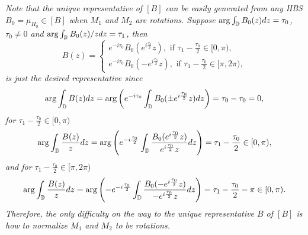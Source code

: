 \documentclass[review,onefignum,onetabnum]{siamonline190516}
\begin{document}
    {\it Note that the unique representative of $[B]$ can be easily generated from any HBS $B_0 = \mu_{H_0} \in [B]$ when $M_1$ and $M_2$ are rotations. Suppose $\arg \int_{\mathbb{D}} B_0(z) dz = \tau_0$, $\tau_0 \neq 0$ and $\arg \int_{\mathbb{D}} B_0(z)/z dz = \tau_1$, then
    \begin{equation}\label{normaled B}
        B(z) = \begin{cases}
            e^{-i\tau_0}B_0(e^{i\frac{\tau_0}{2}}z), \text{ if } \tau_1 - \frac{\tau_0}{2} \in [0, \pi),\\
            e^{-i\tau_0}B_0(-e^{i\frac{\tau_0}{2}}z), \text{ if } \tau_1 - \frac{\tau_0}{2} \in [\pi, 2\pi),
            \end{cases}
    \end{equation}
    is just the desired representative since
    \begin{gather*}
        \arg \int_{\mathbb{D}} B(z) dz = \arg \left( e^{-i\tau_0} \int_{\mathbb{D}} B_0(\pm e^{i\frac{\tau_0}{2}}z)dz \right) = \tau_0-\tau_0 = 0,
    \end{gather*}
    for $\tau_1 - \frac{\tau_0}{2} \in [0, \pi)$
    \begin{gather*}
        \arg \int_{\mathbb{D}} \frac{B(z)}{z} dz = \arg \left( e^{-i\frac{\tau_0}{2}} \int_{\mathbb{D}} \frac{B_0(e^{i\frac{\tau_0}{2}}z)}{e^{i\frac{\tau_0}{2}}z}dz \right) = \tau_1 - \frac{\tau_0}{2} \in [0, \pi),
    \end{gather*}
    and for $\tau_1 - \frac{\tau_0}{2} \in [\pi, 2\pi)$
    \begin{gather*}
        \arg \int_{\mathbb{D}} \frac{B(z)}{z} dz = \arg \left(-e^{-i\frac{\tau_0}{2}} \int_{\mathbb{D}} \frac{B_0(-e^{i\frac{\tau_0}{2}}z)}{-e^{i\frac{\tau_0}{2}}z}dz \right) = \tau_1 - \frac{\tau_0}{2}  - \pi \in [0, \pi).
    \end{gather*}
    Therefore, the only difficulty on the way to the unique representative $B$ of $[B]$ is how to normalize $M_1$ and $M_2$ to be rotations.
    }
\end{document}

